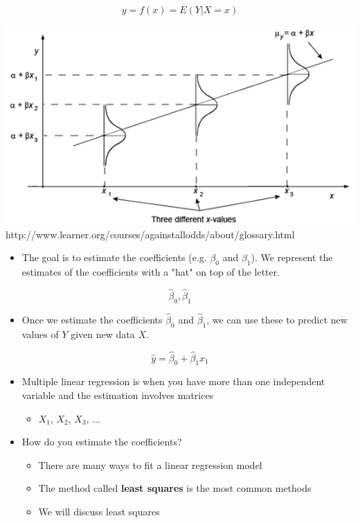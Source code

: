 \documentclass[11pt]{article}
\makeatletter
\def\maxwidth{\ifdim\Gin@nat@width>\linewidth\linewidth
    \else\Gin@nat@width\fi}
\let\Oldincludegraphics\includegraphics
\renewcommand{\includegraphics}[1]{\Oldincludegraphics[width=.8\maxwidth]{#1}}
\providecommand{\tightlist}{%
      \setlength{\itemsep}{0pt}\setlength{\parskip}{0pt}}
\makeatother
\begin{document}
\[ y = f(x) = E(Y | X = x)\]

\includegraphics{images/conditionalmean.png}
http://www.learner.org/courses/againstallodds/about/glossary.html

\begin{itemize}
\tightlist
\item
  The goal is to estimate the coefficients (e.g. \(\beta_0\) and
  \(\beta_1\)). We represent the estimates of the coefficients with a
  "hat" on top of the letter.
\end{itemize}

\[ \hat{\beta}_0, \hat{\beta}_1 \]

\begin{itemize}
\tightlist
\item
  Once we estimate the coefficients \(\hat{\beta}_0\) and
  \(\hat{\beta}_1\), we can use these to predict new values of \(Y\)
  given new data \(X\).
\end{itemize}

\[\hat{y} = \hat{\beta}_0 + \hat{\beta}_1 x_1\]

\begin{itemize}
\tightlist
\item
  Multiple linear regression is when you have more than one independent
  variable and the estimation involves matrices

  \begin{itemize}
  \tightlist
  \item
    \(X_1\), \(X_2\), \(X_3\), \(\ldots\)
  \end{itemize}
\item
  How do you estimate the coefficients?

  \begin{itemize}
  \tightlist
  \item
    There are many ways to fit a linear regression model
  \item
    The method called \textbf{least squares} is the most common methods
  \item
    We will discuss least squares
  \end{itemize}
\end{itemize}
\end{document}
